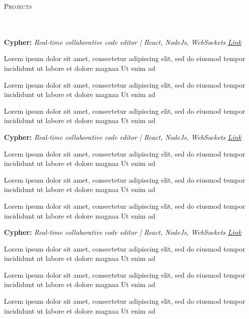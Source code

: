 \documentclass[letterpaper,10pt]{article}
\newcommand{\header}[1]{{
\hspace*{0pt}\vspace*{6pt} \textsc{#1}} \vspace*{-6pt} 
\lineunder
}
\newcommand{\lineunder}{
\vspace*{-8pt} \\ \hspace*{-3pt} 
\hrulefill \\
}
\newcommand{\project}[3]{{
\vspace*{2pt} 
\textbf{#1} \textit{#2} \hfill \textit{#3} \\ }
}
\renewcommand{\labelitemii}{
$\vcenter{\hbox{\tiny$\bullet$}}$\hspace*{-3pt}
}
\newenvironment{bullet-list-minor}{
\begin{list}{\labelitemii}{\setlength\leftmargin{15pt} 
\topsep 0pt \itemsep -2pt}}{\vspace*{4pt}\end{list}
}
\begin{document}
\vspace*{4pt}%
\header{Projects}
    \project{Cypher:}{Real-time collaborative code editor | React, NodeJs, WebSockets }{\href{https://4vinn.netlify.app}{Link}}
    \begin{bullet-list-minor}
    \item Lorem ipsum dolor sit amet, consectetur adipiscing elit, sed do eiusmod tempor incididunt ut labore et dolore magnaa Ut enim ad
    \item Lorem ipsum dolor sit amet, consectetur adipiscing elit, sed do eiusmod tempor incididunt ut labore et dolore magnaa Ut enim ad
    \item Lorem ipsum dolor sit amet, consectetur adipiscing elit, sed do eiusmod tempor incididunt ut labore et dolore magnaa Ut enim ad
    \end{bullet-list-minor}
    
    \project{Cypher:}{Real-time collaborative code editor | React, NodeJs, WebSockets }{\href{https://4vinn.netlify.app}{Link}}
    \begin{bullet-list-minor}
    \item Lorem ipsum dolor sit amet, consectetur adipiscing elit, sed do eiusmod tempor incididunt ut labore et dolore magnaa Ut enim ad
    \item Lorem ipsum dolor sit amet, consectetur adipiscing elit, sed do eiusmod tempor incididunt ut labore et dolore magnaa Ut enim ad
    \item Lorem ipsum dolor sit amet, consectetur adipiscing elit, sed do eiusmod tempor incididunt ut labore et dolore magnaa Ut enim ad
    \end{bullet-list-minor}

    \project{Cypher:}{Real-time collaborative code editor | React, NodeJs, WebSockets }{\href{https://4vinn.netlify.app}{Link}}
    \begin{bullet-list-minor}
    \item Lorem ipsum dolor sit amet, consectetur adipiscing elit, sed do eiusmod tempor incididunt ut labore et dolore magnaa Ut enim ad
    \item Lorem ipsum dolor sit amet, consectetur adipiscing elit, sed do eiusmod tempor incididunt ut labore et dolore magnaa Ut enim ad
    \item Lorem ipsum dolor sit amet, consectetur adipiscing elit, sed do eiusmod tempor incididunt ut labore et dolore magnaa Ut enim ad
    \end{bullet-list-minor}
\end{document}
